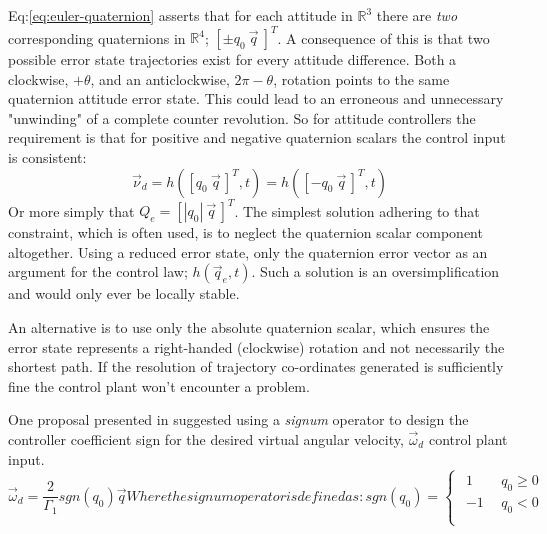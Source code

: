 Eq:\ref{eq:euler-quaternion} asserts that for each attitude in $\mathbb{R}^3$ there are \emph{two} corresponding quaternions in $\mathbb{R}^4$; $[\pm q_0~\vec{q}~]^T$. A consequence of this is that two possible error state trajectories exist for every attitude difference. Both a clockwise, $+\theta$, and an anticlockwise, $2\pi-\theta$, rotation points to the same quaternion attitude error state. This could lead to an erroneous and unnecessary "unwinding" of a complete counter revolution. So for attitude controllers the requirement is that for positive and negative quaternion scalars the control input is consistent:
\begin{equation}
\vec{\nu}_d=h([q_0~\vec{q}\hspace{2pt}]^T,t)=h([-q_0~\vec{q}\hspace{2pt}]^T,t)
\end{equation}
Or more simply that $Q_e=[|q_0|~\vec{q}\hspace{2pt}]^T$. The simplest solution adhering to that constraint, which is often used, is to neglect the quaternion scalar component altogether. Using a reduced error state, only the quaternion error vector as an argument for the control law; $h(\vec{q}_e,t)$. Such a solution is an oversimplification and would only ever be locally stable. 
\par
An alternative is to use only the absolute quaternion scalar, which ensures the error state represents a right-handed (clockwise) rotation and not necessarily the shortest path. If the resolution of trajectory co-ordinates generated is sufficiently fine the control plant won't encounter a problem.
\par
One proposal presented in \cite{nonlinearquadcopter} suggested using a \emph{signum} operator to design the controller coefficient sign for the desired virtual angular velocity, $\vec{\omega}_d$ control plant input. 
\begin{subequations}\label{eq:signum-unwinding}
\begin{equation}
\vec{\omega}_d=\frac{2}{\Gamma_1}sgn(q_0)\vec{q}
\end{equation}
Where the signum operator is defined as:
\begin{equation}
sgn(q_0)=
\begin{cases}\begin{array}{ll}
1 & ~~q_0\geq 0\\
-1 & ~~q_0< 0\\
\end{array}
\end{cases}
\end{equation}
\end{subequations}
